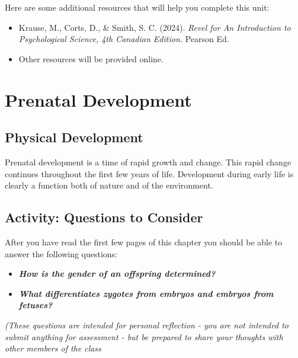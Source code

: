 \documentclass[
]{book}
\providecommand{\tightlist}{%
  \setlength{\itemsep}{0pt}\setlength{\parskip}{0pt}}
\begin{document}
Here are some additional resources that will help you complete this unit:

\begin{itemize}
\tightlist
\item
  Krause, M., Corts, D., \& Smith, S. C. (2024). \emph{Revel for An Introduction to Psychological Science, 4th Canadian Edition.} Pearson Ed.
\item
  Other resources will be provided online.
\end{itemize}

\hypertarget{prenatal-development}{%
\section{Prenatal Development}\label{prenatal-development}}

\hypertarget{physical-development}{%
\subsection*{Physical Development}\label{physical-development}}

Prenatal development is a time of rapid growth and change. This rapid change continues throughout the first few years of life. Development during early life is clearly a function both of nature and of the environment.

\hypertarget{activity-questions-to-consider}{%
\subsection*{Activity: Questions to Consider}\label{activity-questions-to-consider}}

\begin{reflect}
After you have read the first few pages of this chapter you should be able to answer the following questions:

\begin{itemize}
\tightlist
\item
  \textbf{\emph{How is the gender of an offspring determined?}}\\
\item
  \textbf{\emph{What differentiates zygotes from embryos and embryos from fetuses?}}
\end{itemize}

\emph{(These questions are intended for personal reflection - you are not intended to submit anything for assessment - but be prepared to share your thoughts with other members of the class}
\end{reflect}
\end{document}
